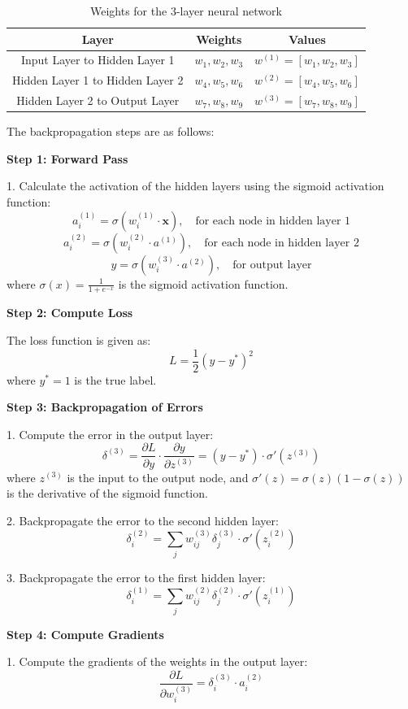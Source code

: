 \documentclass[12pt, fullpage,letterpaper]{article}
\begin{document}
\begin{enumerate}
\begin{table}[h!]
\centering
\begin{tabular}{|c|c|c|}
\hline
Layer & Weights & Values \\ \hline
Input Layer to Hidden Layer 1 & $w_1, w_2, w_3$ & $w^{(1)} = [w_1, w_2, w_3]$ \\
Hidden Layer 1 to Hidden Layer 2 & $w_4, w_5, w_6$ & $w^{(2)} = [w_4, w_5, w_6]$ \\
Hidden Layer 2 to Output Layer & $w_7, w_8, w_9$ & $w^{(3)} = [w_7, w_8, w_9]$ \\
\hline
\end{tabular}
\caption{Weights for the 3-layer neural network}
\label{tb:w}
\end{table}

The backpropagation steps are as follows:

\textbf{Step 1: Forward Pass}

1. Calculate the activation of the hidden layers using the sigmoid activation function:
\[
a^{(1)}_i = \sigma(w^{(1)}_i \cdot \mathbf{x}), \quad \text{for each node in hidden layer 1}
\]
\[
a^{(2)}_i = \sigma(w^{(2)}_i \cdot a^{(1)}), \quad \text{for each node in hidden layer 2}
\]
\[
y = \sigma(w^{(3)}_i \cdot a^{(2)}), \quad \text{for output layer}
\]
where $\sigma(x) = \frac{1}{1 + e^{-x}}$ is the sigmoid activation function.

\textbf{Step 2: Compute Loss}

The loss function is given as:
\[
L = \frac{1}{2}(y - y^*)^2
\]
where $y^* = 1$ is the true label.

\textbf{Step 3: Backpropagation of Errors}

1. Compute the error in the output layer:
\[
\delta^{(3)} = \frac{\partial L}{\partial y} \cdot \frac{\partial y}{\partial z^{(3)}} = (y - y^*) \cdot \sigma'(z^{(3)})
\]
where $z^{(3)}$ is the input to the output node, and $\sigma'(z) = \sigma(z)(1 - \sigma(z))$ is the derivative of the sigmoid function.

2. Backpropagate the error to the second hidden layer:
\[
\delta^{(2)}_i = \sum_j w^{(3)}_{ij} \delta^{(3)}_j \cdot \sigma'(z^{(2)}_i)
\]

3. Backpropagate the error to the first hidden layer:
\[
\delta^{(1)}_i = \sum_j w^{(2)}_{ij} \delta^{(2)}_j \cdot \sigma'(z^{(1)}_i)
\]

\textbf{Step 4: Compute Gradients}

1. Compute the gradients of the weights in the output layer:
\[
\frac{\partial L}{\partial w^{(3)}_i} = \delta^{(3)}_i \cdot a^{(2)}_i
\]


\end{enumerate}
\end{document}
